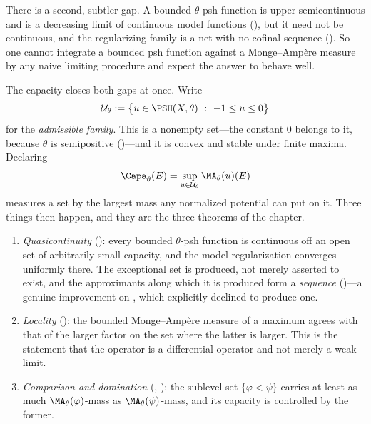 There is a second, subtler gap.  A bounded $\theta$-psh function is upper
semicontinuous and is a decreasing limit of continuous model functions
(), but it need not be continuous,
and the regularizing family is a net with no cofinal sequence
().  So one cannot integrate a bounded psh
function against a Monge--Amp\`ere measure by any naive limiting procedure and
expect the answer to behave well.

The capacity closes both gaps at once.  Write
\begin{equation}
\label{eq:ch25-admissible}
 \mathcal U_\theta
 :=\bigl\{u\in\PSH(X,\theta)\ :\ -1\leq u\leq0\bigr\}
\end{equation}
for the \emph{admissible family}.  This is a nonempty set---the constant
$0$ belongs to it, because $\theta$ is semipositive
()---and it is convex and stable under finite
maxima.  Declaring
\[
              \Capa_\theta(E)=\sup_{u\in\mathcal U_\theta}\MA_\theta(u)(E)
\]
measures a set by the largest mass any normalized potential can put on it.
Three things then happen, and they are the three theorems of the chapter.

\begin{enumerate}
\item\label{itm:ch25-plan:qc}
 \emph{Quasicontinuity} (): every bounded
 $\theta$-psh function is continuous off an open set of arbitrarily small
 capacity, and the model regularization converges uniformly there.  The
 exceptional set is produced, not merely asserted to exist, and the
 approximants along which it is produced form a \emph{sequence}
 ()---a genuine improvement on
 , which explicitly declined
 to produce one.
\item\label{itm:ch25-plan:loc}
 \emph{Locality} (): the bounded
 Monge--Amp\`ere measure of a maximum agrees with that of the larger factor
 on the set where the latter is larger.  This is the statement that the
 operator is a differential operator and not merely a weak limit.
\item\label{itm:ch25-plan:cmp}
 \emph{Comparison and domination}
 (,
 ): the sublevel set
 $\{\varphi<\psi\}$ carries at least as much $\MA_\theta(\varphi)$-mass
 as $\MA_\theta(\psi)$-mass, and its capacity is controlled by the former.
\end{enumerate}

